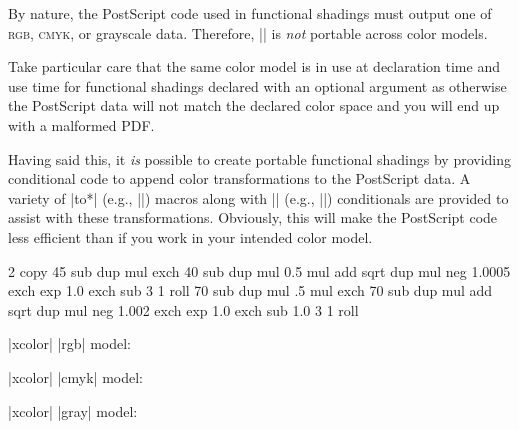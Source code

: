 By nature, the PostScript code used in functional shadings must output one of
\textsc{rgb}, \textsc{cmyk}, or grayscale data. Therefore,
|\pgfdeclarefunctionalshading| is \emph{not} portable across color models.

Take particular care that the same color model is in use at declaration time
and use time for functional shadings declared with an optional argument as
otherwise the PostScript data will not match the declared color space and
you will end up with a malformed PDF.

Having said this, it \emph{is} possible to create portable functional shadings
by providing conditional code to append color transformations to the
PostScript data. A variety of |\pgffuncshading*to*| (e.g.,
|\pgffuncshadingrgbtocmyk|) macros along with |\ifpgfshadingmodel*| (e.g.,
|\ifpgfshadingmodelcmyk|) conditionals are provided to assist with these
transformations. Obviously, this will make the PostScript code less efficient
than if you work in your intended color model.

    {\pgfpointorigin}{\pgfpoint{3.5cm}{3.5cm}}{}{
  2 copy
  45 sub dup mul exch
  40 sub dup mul 0.5 mul add sqrt
  dup mul neg 1.0005 exch exp 1.0 exch sub
  3 1 roll
  70 sub dup mul .5 mul exch
  70 sub dup mul add sqrt
  dup mul neg 1.002 exch exp 1.0 exch sub
  1.0 3 1 roll
  \ifpgfshadingmodelcmyk
    \pgffuncshadingrgbtocmyk
  \fi
  \ifpgfshadingmodelgray
    \pgffuncshadingrgbtogray
  \fi
}
\begin{center}
  \begin{minipage}{3.5cm}
    |xcolor| |rgb| model:\medskip

  \end{minipage}\hspace{2cm}
  \begin{minipage}{3.5cm}
    |xcolor| |cmyk| model:\medskip

  \end{minipage}\hspace{2cm}
  \begin{minipage}{3.5cm}
    |xcolor| |gray| model:\medskip

  \end{minipage}
\end{center}

\begin{codeexample}
\end{codeexample}

